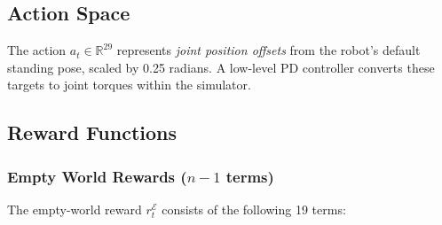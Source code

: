 \documentclass{article}
\begin{document}
\subsection{Action Space}

The action $a_t \in \mathbb{R}^{29}$ represents \emph{joint position offsets}
from the robot's default standing pose, scaled by 0.25 radians.
A low-level PD controller converts these targets to joint torques within the
simulator.

\subsection{Reward Functions}

\subsubsection{Empty World Rewards ($n-1$ terms)}

The empty-world reward $r_t^\mathcal{E}$ consists of the following 19 terms:
\end{document}
